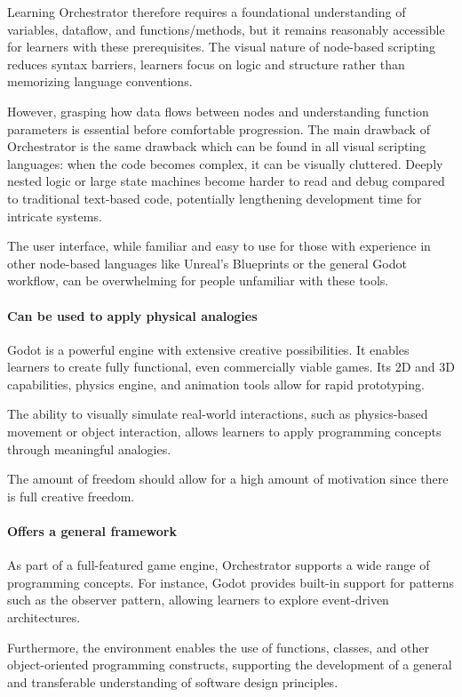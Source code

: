 Learning Orchestrator therefore requires a foundational understanding of variables, dataflow, and functions/methods, but it remains reasonably accessible for learners with these prerequisites.
The visual nature of node-based scripting reduces syntax barriers, learners focus on logic and structure rather than memorizing language conventions.

However, grasping how data flows between nodes and understanding function parameters is essential before comfortable progression.
The main drawback of Orchestrator is the same drawback which can be found in all visual scripting languages: when the code becomes complex, it can be visually cluttered.
Deeply nested logic or large state machines become harder to read and debug compared to traditional text-based code, potentially lengthening development time for intricate systems.

The user interface, while familiar and easy to use for those with experience in other node-based languages like Unreal's Blueprints or the general Godot workflow, can be overwhelming for people unfamiliar with these tools.

\paragraph{Can be used to apply physical analogies}
Godot is a powerful engine with extensive creative possibilities.
It enables learners to create fully functional, even commercially viable games.
Its 2D and 3D capabilities, physics engine, and animation tools allow for rapid prototyping.

The ability to visually simulate real-world interactions, such as physics-based movement or object interaction, allows learners to apply programming concepts through meaningful analogies.

The amount of freedom should allow for a high amount of motivation since there is full creative freedom.

\paragraph{Offers a general framework}

As part of a full-featured game engine, Orchestrator supports a wide range of programming concepts.
For instance, Godot provides built-in support for patterns such as the observer pattern, allowing learners to explore event-driven architectures.

Furthermore, the environment enables the use of functions, classes, and other object-oriented programming constructs, supporting the development of a general and transferable understanding of software design principles.

